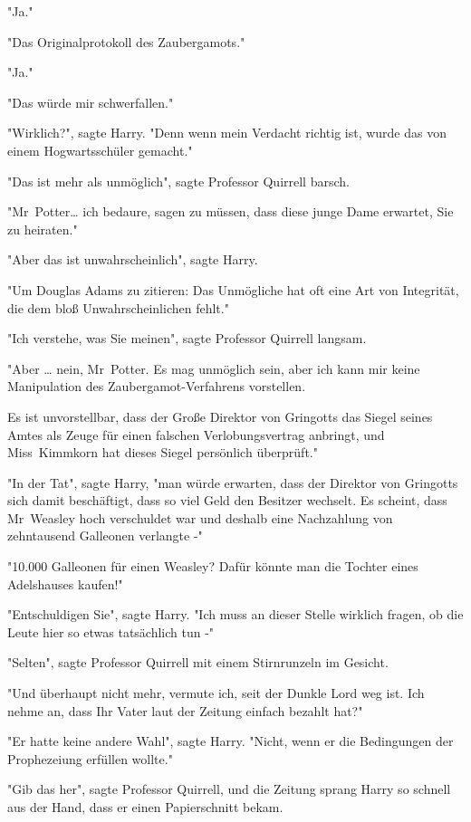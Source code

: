 {"Ja."

"Das Originalprotokoll des Zaubergamots."

"Ja."

"Das würde mir schwerfallen."

"Wirklich?", sagte Harry. "Denn wenn mein Verdacht richtig ist, wurde das von einem Hogwartsschüler gemacht."

"Das ist mehr als unmöglich", sagte Professor Quirrell barsch.

"Mr~Potter… ich bedaure, sagen zu müssen, dass diese junge Dame erwartet, Sie zu heiraten."

"Aber das ist unwahrscheinlich", sagte Harry.

"Um Douglas Adams zu zitieren: Das Unmögliche hat oft eine Art von Integrität, die dem bloß Unwahrscheinlichen fehlt."

"Ich verstehe, was Sie meinen", sagte Professor Quirrell langsam.

"Aber … nein, Mr~Potter. Es mag unmöglich sein, aber ich kann mir keine Manipulation des Zaubergamot-Verfahrens vorstellen.

Es ist unvorstellbar, dass der Große Direktor von Gringotts das Siegel seines Amtes als Zeuge für einen falschen Verlobungsvertrag anbringt, und Miss~Kimmkorn hat dieses Siegel persönlich überprüft."

"In der Tat", sagte Harry, "man würde erwarten, dass der Direktor von Gringotts sich damit beschäftigt, dass so viel Geld den Besitzer wechselt. Es scheint, dass Mr~Weasley hoch verschuldet war und deshalb eine Nachzahlung von zehntausend Galleonen verlangte -"

"10.000 Galleonen für einen Weasley? Dafür könnte man die Tochter eines Adelshauses kaufen!"

"Entschuldigen Sie", sagte Harry. "Ich muss an dieser Stelle wirklich fragen, ob die Leute hier so etwas tatsächlich tun -"

"Selten", sagte Professor Quirrell mit einem Stirnrunzeln im Gesicht.

"Und überhaupt nicht mehr, vermute ich, seit der Dunkle Lord weg ist. Ich nehme an, dass Ihr Vater laut der Zeitung einfach bezahlt hat?"

"Er hatte keine andere Wahl", sagte Harry. "Nicht, wenn er die Bedingungen der Prophezeiung erfüllen wollte."

"Gib das her", sagte Professor Quirrell, und die Zeitung sprang Harry so schnell aus der Hand, dass er einen Papierschnitt bekam.

}
